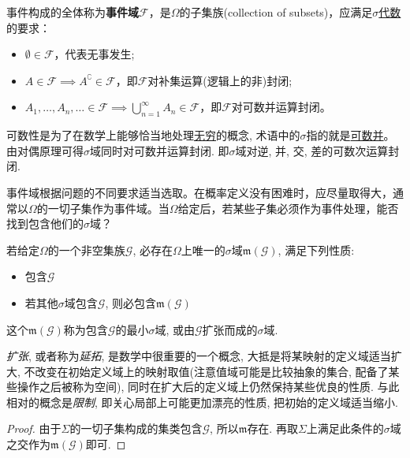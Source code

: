 \begin{definition}[事件域]
    事件构成的全体称为\textbf{事件域}$\mathscr{F}$，是$\Omega$的子集族(collection of subsets)，应满足\underline{$\sigma$代数}的要求：
    \begin{itemize}
        \item $\emptyset \in \mathscr{F}$，代表无事发生;
        \item $A\in\mathscr{F} \implies A^{\complement}\in\mathscr{F}$，即$\mathscr{F}$对补集运算(逻辑上的非)封闭;
        \item $A_{1},\dots,A_{n},\ldots \in \mathscr{F} \implies \bigcup_{n=1}^{\infty}A_{n} \in \mathscr{F}$，即$\mathscr{F}$对可数并运算封闭。
    \end{itemize}
\end{definition}

\begin{remark}
    可数性是为了在数学上能够恰当地处理\underline{无穷}的概念, 术语中的$\sigma$指的就是\underline{可数并}。由对偶原理可得$\sigma$域同时对可数并运算封闭. 即$\sigma$域对逆, 并, 交, 差的可数次运算封闭.
\end{remark}

事件域根据问题的不同要求适当选取。在概率定义没有困难时，应尽量取得大，通常以$\Omega$的一切子集作为事件域。当$\Omega$给定后，若某些子集必须作为事件处理，能否找到包含他们的$\sigma$域？

\begin{proposition}
    若给定$\Omega$的一个非空集族$\mathscr{G}$, 必存在$\Omega$上唯一的$\sigma$域$\mathfrak{m}(\mathscr{G})$, 满足下列性质:
    \begin{itemize}
        \item 包含$\mathscr{G}$
        \item 若其他$\sigma$域包含$\mathscr{G}$, 则必包含$\mathfrak{m}(\mathscr{G})$
    \end{itemize}
    这个$\mathfrak{m}(\mathscr{G})$称为包含$\mathscr{G}$的最小$\sigma$域, 或由$\mathscr{G}$扩张而成的$\sigma$域.
\end{proposition}

\emph{扩张}, 或者称为\emph{延拓}, 是数学中很重要的一个概念, 大抵是将某映射的定义域适当扩大, 不改变在初始定义域上的映射取值(注意值域可能是比较抽象的集合, 配备了某些操作之后被称为空间), 同时在扩大后的定义域上仍然保持某些优良的性质. 与此相对的概念是\emph{限制}, 即关心局部上可能更加漂亮的性质, 把初始的定义域适当缩小.

\begin{proof}
    由于$\Sigma$的一切子集构成的集类包含$\mathscr{G}$, 所以$\mathfrak{m}$存在. 再取$\Sigma$上满足此条件的$\sigma$域之交作为$\mathfrak{m}(\mathscr{G})$即可.
\end{proof}

